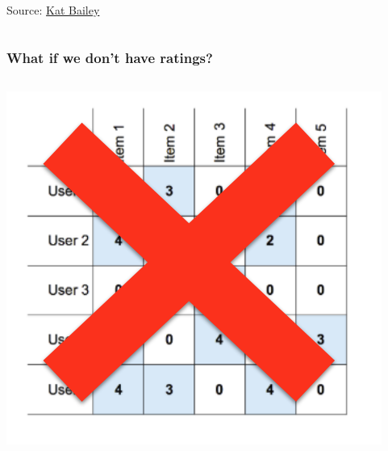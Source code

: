 \documentclass[11pt]{beamer}
\begin{document}
\begin{frame}
\begin{columns}
\begin{column}{0.4\textwidth}
\begin{center}
					{\tiny Source: \href{https://katbailey.github.io/post/matrix-factorization-with-tensorflow/}{\color{blue} Kat Bailey}}
				\end{center}
			\end{column}
		\end{columns}
	\end{frame}

	\begin{frame}
		\frametitle{What if we don't have ratings?}
		\begin{columns}
			\begin{column}{0.5\textwidth}
				\begin{center}
					\centering
					\includegraphics[width=\textwidth]{images/no-rating.png}
				\end{center}
			\end{column}
			\begin{column}{0.5\textwidth}
				\begin{center}
					\centering

\end{center}
\end{column}
\end{columns}
\end{frame}
\end{document}
